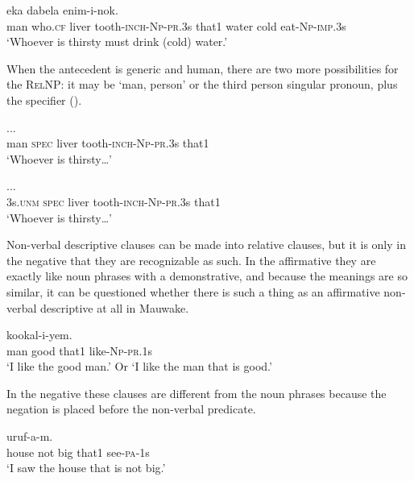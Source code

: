 \ea%
\label{ex:x1563}
  eka  dabela enim-i-nok.\\
man  who.\textsc{cf} liver  tooth-\textsc{inch}-\textsc{Np}-\textsc{pr}.3s  that1  water  cold eat-\textsc{Np}-\textsc{imp}.3s\\
\glt`Whoever is thirsty must drink (cold) water.'
\z


When the antecedent is generic and human, there are two more possibilities for the \textsc{RelNP}: it may be  `man, person' or the third person singular pronoun, plus the specifier  (). 

\ea%
\label{ex:x1564}
  ... \\
man  \textsc{spec} liver  tooth-\textsc{inch}-\textsc{Np}-\textsc{pr}.3s  that1\\
\glt`Whoever is thirsty{\dots}'
\z


\ea%
\label{ex:x1565}
  ... \\
3s.\textsc{unm} \textsc{spec} liver tooth-\textsc{inch}-\textsc{Np}-\textsc{pr}.3s  that1\\
\glt`Whoever is thirsty{\dots}'
\z


Non-verbal descriptive clauses can be made into relative clauses, but it is only in the negative that they are recognizable as such. In the affirmative they are exactly like noun phrases with a demonstrative, and because the meanings are so similar, it can be questioned whether there is such a thing as an affirmative non-verbal descriptive  at all in Mauwake.  

\ea%
\label{ex:x1550}
  kookal-i-yem.\\
man  good  that1  like-\textsc{Np}-\textsc{pr}.1s\\
\glt`I like the good man.' Or `I like the man that is good.'
\z


In the negative these clauses are different from the noun phrases because the negation is placed before the non-verbal predicate.

\ea%
\label{ex:x1551}
  uruf-a-m. \\
house  not  big  that1  see-\textsc{pa}-1s\\
\glt`I saw the house that is not big.'
\z


